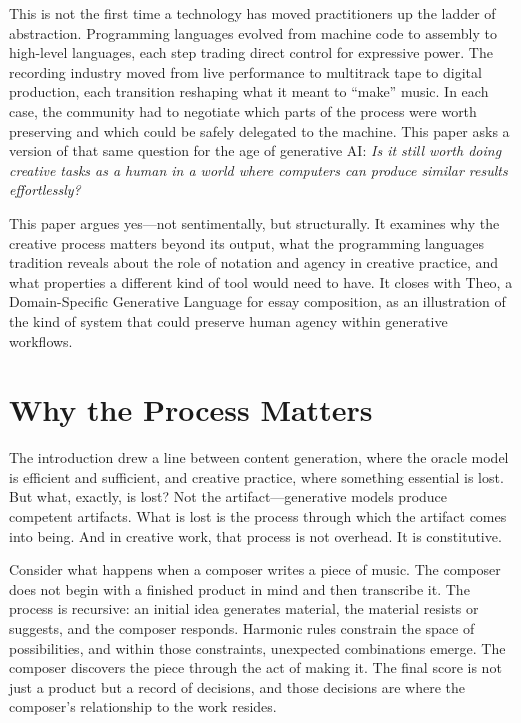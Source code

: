 \documentclass[11pt]{article}
\begin{document}
This is not the first time a technology has moved practitioners up the ladder of abstraction. Programming languages evolved from machine code to assembly to high-level languages, each step trading direct control for expressive power. The recording industry moved from live performance to multitrack tape to digital production, each transition reshaping what it meant to ``make'' music. In each case, the community had to negotiate which parts of the process were worth preserving and which could be safely delegated to the machine. This paper asks a version of that same question for the age of generative AI: \emph{Is it still worth doing creative tasks as a human in a world where computers can produce similar results effortlessly?}

This paper argues yes---not sentimentally, but structurally. It examines why the creative process matters beyond its output, what the programming languages tradition reveals about the role of notation and agency in creative practice, and what properties a different kind of tool would need to have. It closes with Theo, a Domain-Specific Generative Language for essay composition, as an illustration of the kind of system that could preserve human agency within generative workflows.

\section{Why the Process Matters}

The introduction drew a line between content generation, where the oracle model is efficient and sufficient, and creative practice, where something essential is lost. But what, exactly, is lost? Not the artifact---generative models produce competent artifacts. What is lost is the process through which the artifact comes into being. And in creative work, that process is not overhead. It is constitutive.

Consider what happens when a composer writes a piece of music. The composer does not begin with a finished product in mind and then transcribe it. The process is recursive: an initial idea generates material, the material resists or suggests, and the composer responds. Harmonic rules constrain the space of possibilities, and within those constraints, unexpected combinations emerge. The composer discovers the piece through the act of making it. The final score is not just a product but a record of decisions, and those decisions are where the composer's relationship to the work resides.
\end{document}
